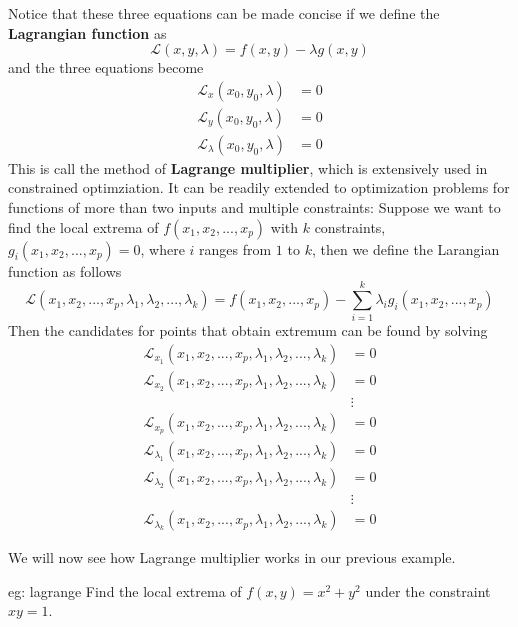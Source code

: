Notice that these three equations can be made concise if we define the \textbf{Lagrangian function} as
\[\mathcal{L}(x,y,\lambda) = f(x,y) - \lambda g(x,y)\]
and the three equations become
\begin{align*}
    \mathcal{L}_x(x_0,y_0,\lambda) &= 0\\
    \mathcal{L}_y(x_0,y_0,\lambda) &= 0\\
    \mathcal{L}_\lambda(x_0,y_0,\lambda) &= 0
\end{align*}
This is call the method of \textbf{Lagrange multiplier}, which is extensively used in constrained optimziation.  It can be readily extended to optimization problems for functions of more than two inputs and multiple constraints: Suppose we want to find the local extrema of $f(x_1, x_2, ..., x_p)$ with $k$ constraints, $g_i(x_1, x_2, ..., x_p) = 0$, where $i$ ranges from $1$ to $k$, then we define the Larangian function as follows
\[\mathcal{L}(x_1, x_2, ..., x_p, \lambda_1, \lambda_2, ..., \lambda_k) = f(x_1, x_2, ..., x_p) - \sum_{i=1}^k \lambda_i g_i(x_1, x_2, ..., x_p)\]
Then the candidates for points that obtain extremum can be found by solving
\begin{align*}
    \mathcal{L}_{x_1}(x_1, x_2, ..., x_p, \lambda_1, \lambda_2, ..., \lambda_k) &= 0\\
    \mathcal{L}_{x_2}(x_1, x_2, ..., x_p, \lambda_1, \lambda_2, ..., \lambda_k) &= 0\\
    &\vdots\\
    \mathcal{L}_{x_p}(x_1, x_2, ..., x_p, \lambda_1, \lambda_2, ..., \lambda_k) &= 0\\
    \mathcal{L}_{\lambda_1}(x_1, x_2, ..., x_p, \lambda_1, \lambda_2, ..., \lambda_k) &= 0\\
    \mathcal{L}_{\lambda_2}(x_1, x_2, ..., x_p, \lambda_1, \lambda_2, ..., \lambda_k) &= 0\\
    &\vdots\\
    \mathcal{L}_{\lambda_k}(x_1, x_2, ..., x_p, \lambda_1, \lambda_2, ..., \lambda_k) &= 0
\end{align*}

We will now see how Lagrange multiplier works in our previous example.

\begin{eg}[]{eg: lagrange}
   Find the local extrema of $f(x,y) = x^2 + y^2$ under the constraint $xy = 1$.
\end{eg}

